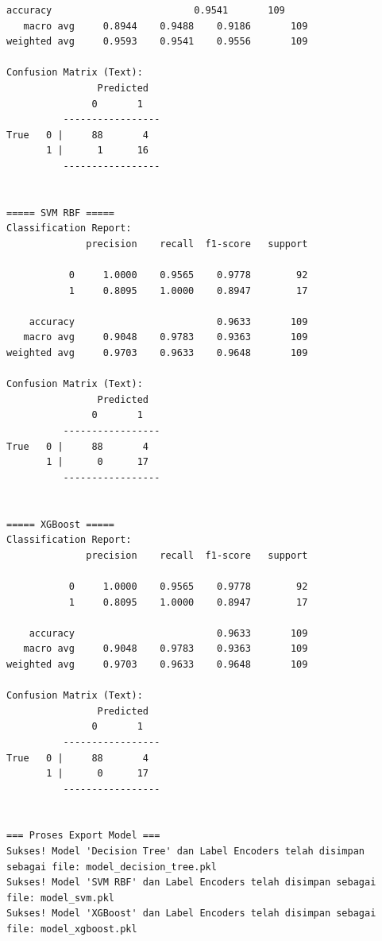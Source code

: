 \begin{lstlisting}[caption={Output 22}]
    accuracy                         0.9541       109
   macro avg     0.8944    0.9488    0.9186       109
weighted avg     0.9593    0.9541    0.9556       109

Confusion Matrix (Text):
                Predicted
               0       1
          -----------------
True   0 |     88       4
       1 |      1      16
          -----------------


===== SVM RBF =====
Classification Report:
              precision    recall  f1-score   support

           0     1.0000    0.9565    0.9778        92
           1     0.8095    1.0000    0.8947        17

    accuracy                         0.9633       109
   macro avg     0.9048    0.9783    0.9363       109
weighted avg     0.9703    0.9633    0.9648       109

Confusion Matrix (Text):
                Predicted
               0       1
          -----------------
True   0 |     88       4
       1 |      0      17
          -----------------


===== XGBoost =====
Classification Report:
              precision    recall  f1-score   support

           0     1.0000    0.9565    0.9778        92
           1     0.8095    1.0000    0.8947        17

    accuracy                         0.9633       109
   macro avg     0.9048    0.9783    0.9363       109
weighted avg     0.9703    0.9633    0.9648       109

Confusion Matrix (Text):
                Predicted
               0       1
          -----------------
True   0 |     88       4
       1 |      0      17
          -----------------


=== Proses Export Model ===
Sukses! Model 'Decision Tree' dan Label Encoders telah disimpan sebagai file: model_decision_tree.pkl
Sukses! Model 'SVM RBF' dan Label Encoders telah disimpan sebagai file: model_svm.pkl
Sukses! Model 'XGBoost' dan Label Encoders telah disimpan sebagai file: model_xgboost.pkl
\end{lstlisting}
















